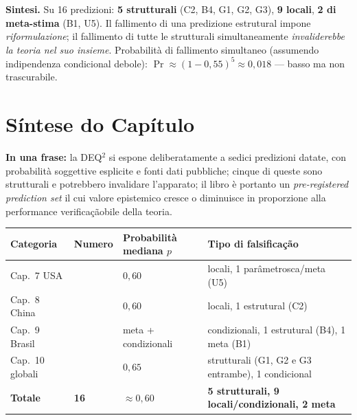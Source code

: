 \Proved{} \textbf{Sintesi.} Su 16 predizioni: \textbf{5 strutturali}
(C2, B4, G1, G2, G3), \textbf{9 locali}, \textbf{2 di meta-stima} (B1,
U5). Il fallimento di una predizione estrutural impone
\emph{riformulazione}; il fallimento di tutte le strutturali
simultaneamente \emph{invaliderebbe la teoria nel suo insieme}.
Probabilità di fallimento simultaneo (assumendo indipendenza
condicional debole): \(\Pr \approx (1-0{,}55)^5 \approx 0{,}018\) ---
basso ma non trascurabile.



\section{Síntese do Capítulo}\label{sintesi-del-capítulo}

\Proved{} \textbf{In una frase:} la DEQ$^2$ si espone deliberatamente a
sedici predizioni datate, con probabilità soggettive esplicite e fonti
dati pubbliche; cinque di queste sono strutturali e potrebbero
invalidare l'apparato; il libro è portanto un \emph{pre-registered
prediction set} il cui valore epistemico cresce o diminuisce in
proporzione alla performance verificaçãobile della teoria.

{\def\LTcaptype{none} %
{\small\begin{longtable}[]{@{}
  >{\raggedright\arraybackslash}p{}
  >{\raggedright\arraybackslash}p{}
  >{\raggedright\arraybackslash}p{}
  >{\raggedright\arraybackslash}p{}@{}}
\toprule\noalign{}
\begin{minipage}[b]{\linewidth}\raggedright
Categoria
\end{minipage} & \begin{minipage}[b]{\linewidth}\raggedright
Numero
\end{minipage} & \begin{minipage}[b]{\linewidth}\raggedright
Probabilità mediana \(p\)
\end{minipage} & \begin{minipage}[b]{\linewidth}\raggedright
Tipo di falsificação
\end{minipage} \\
\midrule\noalign{}
\endhead
\bottomrule\noalign{}
\endlastfoot
Cap.~7 USA & 5 & \(0{,}60\) & 4 locali, 1 parâmetrosca/meta (U5) \\
Cap.~8 China & 4 & \(0{,}60\) & 3 locali, 1 estrutural (C2) \\
Cap.~9 Brasil & 4 & meta + condizionali & 2 condizionali, 1 estrutural
(B4), 1 meta (B1) \\
Cap.~10 globali & 3 & \(0{,}65\) & 2 strutturali (G1, G2 e G3 entrambe),
1 condicional \\
\textbf{Totale} & \textbf{16} & \(\approx 0{,}60\) & \textbf{5
strutturali, 9 locali/condizionali, 2 meta} \\
\end{longtable}}
}

